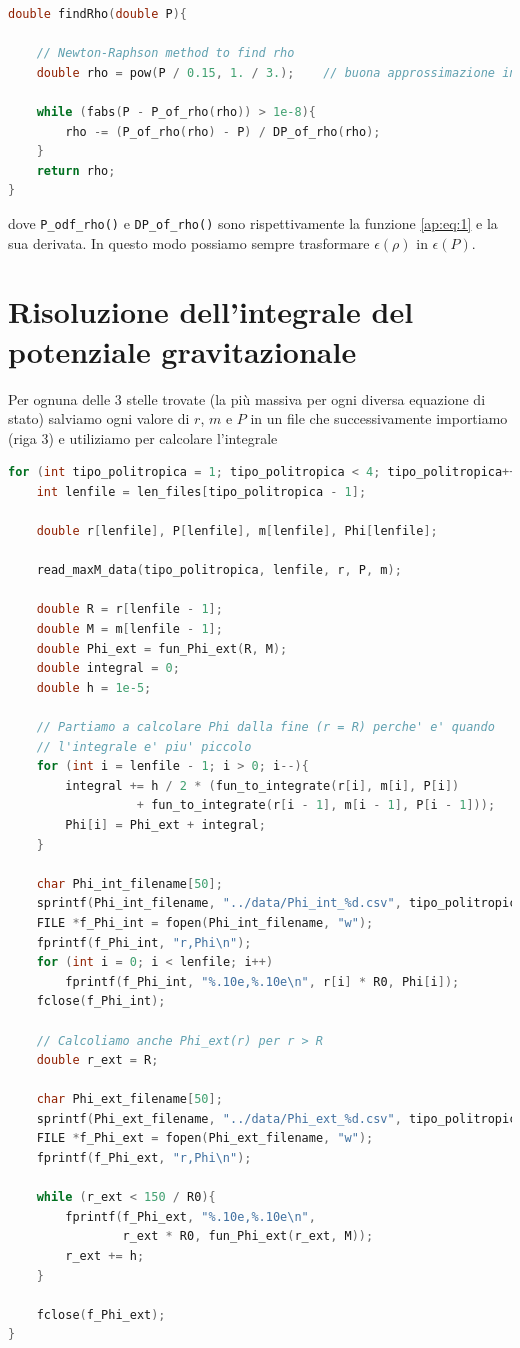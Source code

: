 \documentclass[a4paper, titlepage]{article}
\begin{document}
\begin{lstlisting}[language=C]
double findRho(double P){

    // Newton-Raphson method to find rho
    double rho = pow(P / 0.15, 1. / 3.);    // buona approssimazione iniziale
                                           
    while (fabs(P - P_of_rho(rho)) > 1e-8){
        rho -= (P_of_rho(rho) - P) / DP_of_rho(rho);
    }
    return rho;
}
\end{lstlisting}

dove \texttt{P\_odf\_rho()} e \texttt{DP\_of\_rho()} sono rispettivamente la
funzione \ref{ap:eq:1} e la sua derivata. In questo modo possiamo sempre
trasformare $\epsilon (\rho)$ in $\epsilon (P)$.


\section{Risoluzione dell'integrale del potenziale gravitazionale} \label{ap:Phi}

Per ognuna delle 3 stelle trovate (la più massiva per ogni diversa equazione di
stato) salviamo ogni valore di $r$, $m$ e $P$ in un file che successivamente
importiamo (riga 3) e utiliziamo per calcolare l'integrale

\begin{lstlisting}[language=C]
for (int tipo_politropica = 1; tipo_politropica < 4; tipo_politropica++){
    int lenfile = len_files[tipo_politropica - 1];

    double r[lenfile], P[lenfile], m[lenfile], Phi[lenfile];

    read_maxM_data(tipo_politropica, lenfile, r, P, m);

    double R = r[lenfile - 1];
    double M = m[lenfile - 1];
    double Phi_ext = fun_Phi_ext(R, M);
    double integral = 0;
    double h = 1e-5;

    // Partiamo a calcolare Phi dalla fine (r = R) perche' e' quando
    // l'integrale e' piu' piccolo
    for (int i = lenfile - 1; i > 0; i--){
        integral += h / 2 * (fun_to_integrate(r[i], m[i], P[i])
                  + fun_to_integrate(r[i - 1], m[i - 1], P[i - 1]));
        Phi[i] = Phi_ext + integral;
    }

    char Phi_int_filename[50];
    sprintf(Phi_int_filename, "../data/Phi_int_%d.csv", tipo_politropica);
    FILE *f_Phi_int = fopen(Phi_int_filename, "w");
    fprintf(f_Phi_int, "r,Phi\n");
    for (int i = 0; i < lenfile; i++)
        fprintf(f_Phi_int, "%.10e,%.10e\n", r[i] * R0, Phi[i]);
    fclose(f_Phi_int);

    // Calcoliamo anche Phi_ext(r) per r > R
    double r_ext = R;

    char Phi_ext_filename[50];
    sprintf(Phi_ext_filename, "../data/Phi_ext_%d.csv", tipo_politropica);
    FILE *f_Phi_ext = fopen(Phi_ext_filename, "w");
    fprintf(f_Phi_ext, "r,Phi\n");

    while (r_ext < 150 / R0){
        fprintf(f_Phi_ext, "%.10e,%.10e\n",
                r_ext * R0, fun_Phi_ext(r_ext, M));
        r_ext += h;
    }

    fclose(f_Phi_ext);
}
\end{lstlisting}
\end{document}
